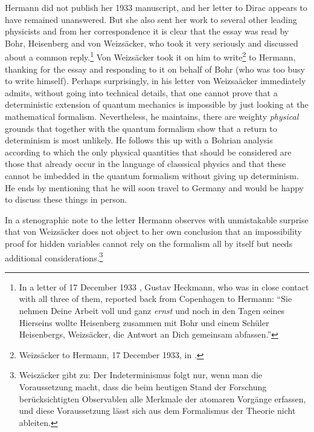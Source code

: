 \documentclass[11pt]{article}
\begin{document}
Hermann did not publish her 1933 manuscript, and her letter to Dirac appears to have remained unanswered. But she also sent her work to several other leading physicists and from her correspondence \cite{kay} it is clear that the essay was read by Bohr, Heisenberg and von Weizs\"{a}cker, who took it very seriously and discussed about a common reply.\footnote{In a letter of 17 December 1933 \cite{kay}, Gustav Heckmann, who was in close contact with all three of them, reported back from Copenhagen to Hermann: ``Sie nehmen Deine Arbeit voll und ganz \textit{ernst} und noch in den Tagen seines Hierseins wollte Heisenberg zusammen mit Bohr und einem Sch\"{u}ler Heisenbergs, Weizs\"{a}cker, die Antwort an Dich gemeinsam abfassen.'' } Von Weizs\"{a}cker took it on him to write\footnote{Weizs\"{a}cker to Hermann, 17 December 1933, in \cite{kay}.} to Hermann, thanking for the essay and responding to it on behalf of Bohr (who was too busy to write himself). Perhaps surprisingly, in his letter von Weizsa\"{a}cker immediately admits, without going into technical details, that one cannot prove that a deterministic extension of quantum mechanics is impossible by just looking at the mathematical formalism. Nevertheless, he maintains, there are weighty \emph{physical} grounds that together with the quantum formalism show that a return to determinism is most unlikely. He follows this up with a Bohrian analysis according to which the only physical quantities that should be considered are those that already occur in the language of classsical physics and that these cannot be imbedded in the quantum formalism without giving up determinism. He ends by mentioning that he will soon travel to Germany and would be happy to discuss these things in person. 

In a stenographic note to the letter Hermann observes with unmistakable surprise that von Weizs\"{a}cker does not object to her own conclusion that an impossibility proof for hidden variables cannot rely on the formalism all by itself but needs additional considerations.\footnote{Weisz\"{a}cker gibt zu: Der Indeterminismus folgt nur, wenn man die Voraussetzung macht, dass die beim heutigen Stand der Forschung ber\"{u}cksichtigten Observablen  alle Merkmale der atomaren Vorg\"{a}nge erfassen, und diese Voraussetzung l\"{a}sst sich aus dem Formalismus der Theorie nicht ableiten.}
\end{document}
